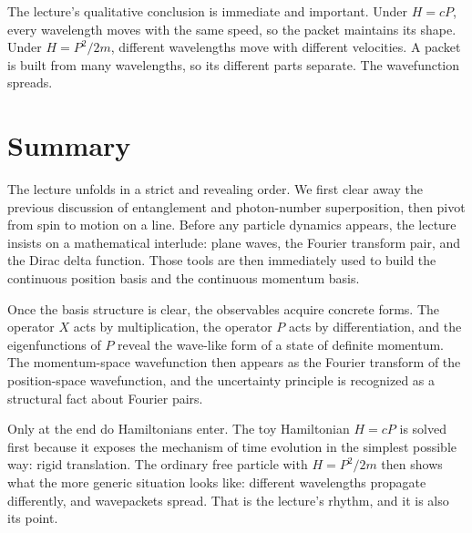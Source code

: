 The lecture's qualitative conclusion is immediate and important. Under $H=cP$, every wavelength moves with the same speed, so the packet maintains its shape. Under $H=P^2/2m$, different wavelengths move with different velocities. A packet is built from many wavelengths, so its different parts separate. The wavefunction spreads.

\section{Summary}

The lecture unfolds in a strict and revealing order. We first clear away the previous discussion of entanglement and photon-number superposition, then pivot from spin to motion on a line. Before any particle dynamics appears, the lecture insists on a mathematical interlude: plane waves, the Fourier transform pair, and the Dirac delta function. Those tools are then immediately used to build the continuous position basis and the continuous momentum basis.

Once the basis structure is clear, the observables acquire concrete forms. The operator $X$ acts by multiplication, the operator $P$ acts by differentiation, and the eigenfunctions of $P$ reveal the wave-like form of a state of definite momentum. The momentum-space wavefunction then appears as the Fourier transform of the position-space wavefunction, and the uncertainty principle is recognized as a structural fact about Fourier pairs.

Only at the end do Hamiltonians enter. The toy Hamiltonian $H=cP$ is solved first because it exposes the mechanism of time evolution in the simplest possible way: rigid translation. The ordinary free particle with $H=P^2/2m$ then shows what the more generic situation looks like: different wavelengths propagate differently, and wavepackets spread. That is the lecture's rhythm, and it is also its point.